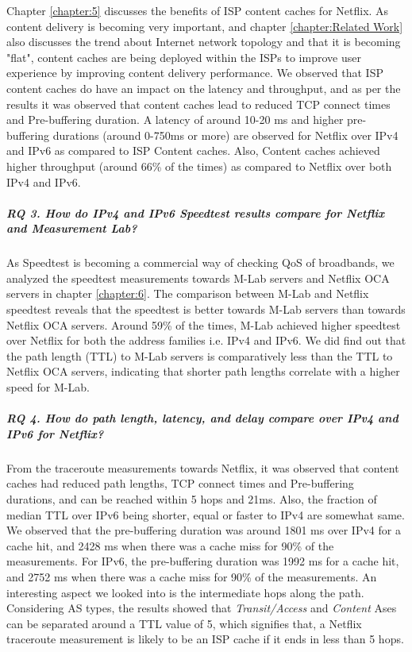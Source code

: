 Chapter \ref{chapter:5} discusses the benefits of ISP content caches for Netflix. As content delivery is becoming very important, and chapter \ref{chapter:Related Work} also discusses the trend about Internet network topology and that it is becoming "flat", content caches are being deployed within the ISPs to improve user experience by improving content delivery performance. We observed that ISP content caches do have an impact on the latency and throughput, and as per the results it was observed that content caches lead to reduced TCP connect times and Pre-buffering duration. 
 A latency of around 10-20 ms and higher pre-buffering durations (around 0-750ms or more) are observed for Netflix over IPv4 and IPv6 as compared to ISP Content caches.
 Also, Content caches achieved higher throughput (around 66\% of the times) as compared to Netflix over both IPv4 and IPv6.
 
\subparagraph{RQ 3. How do IPv4 and IPv6 Speedtest results compare for Netflix and Measurement Lab?}
 
 
As Speedtest is becoming a commercial way of checking QoS of broadbands, we analyzed the speedtest measurements towards M-Lab servers and Netflix OCA servers in chapter \ref{chapter:6}. 
The comparison between M-Lab and Netflix speedtest reveals that the speedtest is better towards M-Lab servers than towards Netflix OCA servers. Around 59\% of the times, M-Lab achieved higher speedtest over Netflix
for both the address families i.e. IPv4 and IPv6. We did find out that the path length (TTL) to M-Lab servers is comparatively less than the TTL to Netflix OCA servers, indicating that shorter path lengths correlate with a higher speed for M-Lab. 
 
 
 \subparagraph{RQ 4. How do path length, latency, and delay compare over IPv4 and IPv6 for Netflix?}
 
 
From the traceroute measurements towards Netflix, it was observed that content caches had reduced path lengths, TCP connect times and Pre-buffering durations, and can be reached within 5 hops and 21ms.
Also, the fraction of median TTL over IPv6 being shorter, equal or faster to IPv4 are somewhat same. We observed that the pre-buffering duration was around 1801 ms over IPv4 for a cache hit, and 2428 ms when there was a cache miss for 90\% of the measurements. 
For IPv6, the pre-buffering duration was 1992 ms for a cache hit, and 2752 ms when there was a cache miss for 90\% of the measurements. An interesting aspect we looked into is the intermediate
hops along the path. Considering AS types, the results showed that \textit{Transit/Access} and \textit{Content} Ases can be separated around a TTL value of 5, which signifies that, a Netflix traceroute
measurement is likely to be an ISP cache if it ends in less than 5 hops. 


